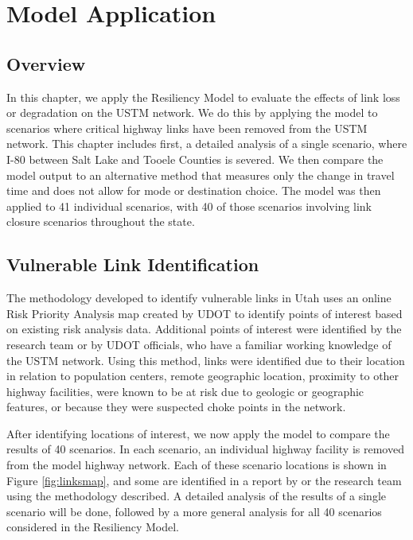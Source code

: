 \chapter{Model Application}
\label{chp:chapter4}
\graphicspath{{figures/}{figures/chapter4/}}

\section{Overview}
In this chapter, we apply the Resiliency Model to evaluate the effects of link
loss or degradation on the USTM network. We do this by applying the model to scenarios
where critical highway links have been removed from the USTM network. This
chapter includes first, a detailed analysis of a single scenario, where I-80
between Salt Lake and Tooele Counties is severed. We then compare the model
output to an alternative method that measures only the change in travel
time and does not allow for mode or destination choice. The model was then
applied to 41 individual scenarios, with 40 of those scenarios involving link
closure scenarios throughout the state.

\section{Vulnerable Link Identification}
The methodology developed to identify vulnerable links in Utah uses an online Risk Priority Analysis map created by UDOT to identify points of interest based on existing risk analysis data. Additional
points of interest were identified by the research team or by UDOT officials, who have a familiar working knowledge of the USTM network. Using this
method, links were identified due to their location in relation to
population centers, remote geographic location, proximity to other highway facilities, were known to be at risk due to geologic or geographic features, or
because they were suspected choke points in the network.

After identifying locations of interest, we now apply the model to compare the results of 40 scenarios. In each scenario, an individual highway
facility is removed from the model highway network. Each of these scenario locations is shown in Figure \ref{fig:linksmap}, and some are identified in a report by
\cite{aem2017} or the research team using the methodology described. A detailed analysis of the results of a single scenario will be done, followed by a
more general analysis for all 40 scenarios considered in the Resiliency Model.

